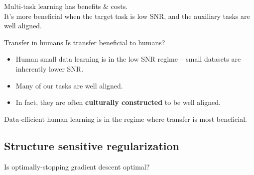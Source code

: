 \documentclass{beamer}
\begin{document}
\begin{frame}[standout]
Multi-task learning has benefits \& costs.\\[1em]
It's more beneficial when the target task is low SNR, and the auxiliary tasks are well aligned.
\end{frame}

\begin{frame}{Transfer in humans}
Is transfer beneficial to humans?
\begin{itemize}[<+->] \itemsep 1em
\item Human small data learning is in the low SNR regime -- small datasets are inherently lower SNR.
\item Many of our tasks are well aligned.
\item In fact, they are often {\bf culturally constructed} to be well aligned.
\end{itemize}
\end{frame}

\begin{frame}[standout]
Data-efficient human learning is in the regime where transfer is most beneficial.
\end{frame}


\subsection{Structure sensitive regularization}
\begin{frame}{Is optimally-stopping gradient descent optimal?}
\end{frame}
\end{document}
